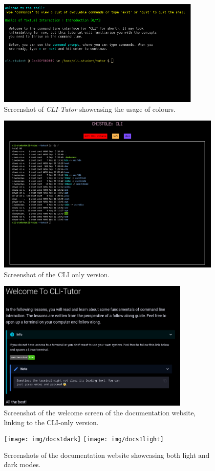 \begin{figure}[htbp]
	\centering
	\includegraphics[width=0.9\textwidth]{img/lesson1.1}
	\caption{Screenshot of \textit{CLI-Tutor} showcasing the usage of colours.}
	\label{fig:colours}
\end{figure}

\begin{figure}[htbp]
	\centering
	\includegraphics[width=1\textwidth]{img/clionly}
	\caption{Screenshot of the CLI only version.}
	\label{fig:welcomedocs}
\end{figure}
\begin{figure}[htbp]
	\centering
	\includegraphics[width=0.85\textwidth]{img/docswelcomedark}
	\caption{Screenshot of the welcome screen of the documentation website, linking to the CLI-only version.}
	\label{fig:cliversion}
\end{figure}

\begin{figure}[htbp]
	\centering
	\texttt{[image: img/docs1dark]}
	\texttt{[image: img/docs1light]}
	\caption{Screenshots of the documentation website showcasing both light and dark modes.}
	\label{fig:docsweb}
\end{figure}
